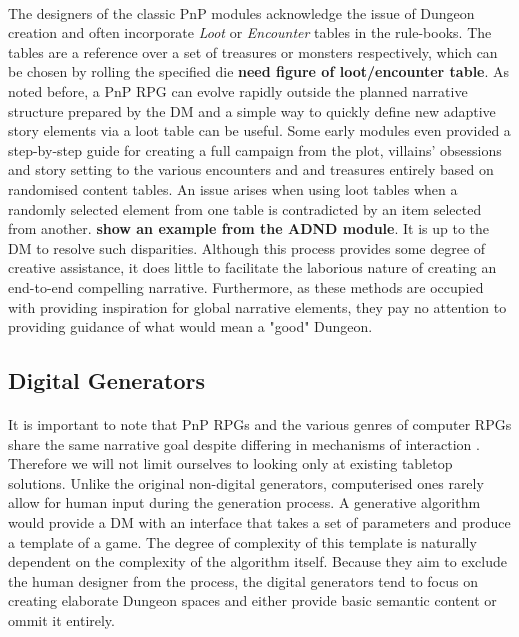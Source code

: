 \documentclass{UoYCSproject}
\begin{document}
\paragraph{}
The designers of the classic PnP modules acknowledge the issue of Dungeon creation and often incorporate \textit{Loot} or \textit{Encounter} tables in the rule-books. The tables are a reference over a set of treasures or monsters respectively, which can be chosen by rolling the specified die \textbf{need figure of loot/encounter table}. As noted before, a PnP RPG can evolve rapidly outside the planned narrative structure prepared by the DM and a simple way to quickly define new adaptive story elements via a loot table can be useful. Some early modules even provided a step-by-step guide for creating a full campaign from the plot, villains' obsessions and story setting to the various encounters and and treasures \parencite{ADnD} entirely based on randomised content tables. An issue arises when using loot tables when a randomly selected element from one table is contradicted by an item selected from another. \textbf{show an example from the ADND module}. It is up to the DM to resolve such disparities. Although this process provides some degree of creative assistance, it does little to facilitate the laborious nature of creating an end-to-end compelling narrative. Furthermore, as these methods are occupied with providing inspiration for global narrative elements, they pay no attention to providing guidance of what would mean a "good" Dungeon.

\subsection{Digital Generators}
\paragraph{}
It is important to note that PnP RPGs and the various genres of computer RPGs share the same narrative goal despite differing in mechanisms of interaction \parencite{Tychsen2006}. Therefore we will not limit ourselves to looking only at existing tabletop solutions.
Unlike the original non-digital generators, computerised ones rarely allow for human input during the generation process. A generative algorithm would provide a DM with an interface that takes a set of parameters and produce a template of a game. The degree of complexity of this template is naturally dependent on the complexity of the algorithm itself. Because they aim to exclude the human designer from the process, the digital generators tend to focus on creating elaborate Dungeon spaces and either provide basic semantic content or ommit it entirely.
\end{document}

